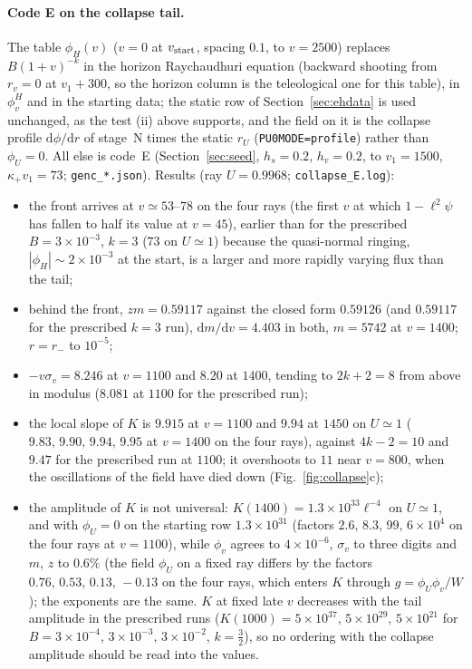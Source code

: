 \documentclass[11pt]{article}
\begin{document}
\paragraph{Code E on the collapse tail.} The table $\phi_H(v)$ ($v=0$ at $v_{\rm start}$, spacing $0.1$, to $v=2500$) replaces $B(1+v)^{-k}$ in the horizon Raychaudhuri equation (backward shooting from $r_v=0$ at $v_1+300$, so the horizon column is the teleological one for this table), in $\phi_v^{H}$ and in the starting data; the static row of Section~\ref{sec:ehdata} is used unchanged, as the test (ii) above supports, and the field on it is the collapse profile $\mathrm d\phi/\mathrm dr$ of stage~N times the static $r_U$ (\texttt{PU0MODE=profile}) rather than $\phi_U=0$. All else is code~E (Section~\ref{sec:seed}, $h_s=0.2$, $h_v=0.2$, to $v_1=1500$, $\kappa_+v_1=73$; \texttt{genc\_*.json}). Results (ray $U=0.9968$; \texttt{collapse\_E.log}):
\begin{itemize}
\item the front arrives at $v\simeq53$--$78$ on the four rays (the first $v$ at which $1-\ell^{2}\psi$ has fallen to half its value at $v=45$), earlier than for the prescribed $B=3\times10^{-3}$, $k=3$ ($73$ on $U\simeq1$) because the quasi-normal ringing, $|\phi_H|\sim2\times10^{-3}$ at the start, is a larger and more rapidly varying flux than the tail;
\item behind the front, $zm=0.59117$ against the closed form $0.59126$ (and $0.59117$ for the prescribed $k=3$ run), $\mathrm dm/\mathrm dv=4.403$ in both, $m=5742$ at $v=1400$; $r=r_-$ to $10^{-5}$;
\item $-v\sigma_v=8.246$ at $v=1100$ and $8.20$ at $1400$, tending to $2k+2=8$ from above in modulus ($8.081$ at $1100$ for the prescribed run);
\item the local slope of $K$ is $9.915$ at $v=1100$ and $9.94$ at $1450$ on $U\simeq1$ ($9.83,\,9.90,\,9.94,\,9.95$ at $v=1400$ on the four rays), against $4k-2=10$ and $9.47$ for the prescribed run at $1100$; it overshoots to $11$ near $v=800$, when the oscillations of the field have died down (Fig.~\ref{fig:collapse}c);
\item the amplitude of $K$ is not universal: $K(1400)=1.3\times10^{33}\ell^{-4}$ on $U\simeq1$, and with $\phi_U=0$ on the starting row $1.3\times10^{31}$ (factors $2.6,\,8.3,\,99,\,6\times10^{4}$ on the four rays at $v=1100$), while $\phi_v$ agrees to $4\times10^{-6}$, $\sigma_v$ to three digits and $m$, $z$ to $0.6\%$ (the field $\phi_U$ on a fixed ray differs by the factors $0.76,\,0.53,\,0.13,\,-0.13$ on the four rays, which enters $K$ through $g=\phi_U\phi_v/W$); the exponents are the same. $K$ at fixed late $v$ decreases with the tail amplitude in the prescribed runs ($K(1000)=5\times10^{37},\,5\times10^{29},\,5\times10^{21}$ for $B=3\times10^{-4},\,3\times10^{-3},\,3\times10^{-2}$, $k=\tfrac32$), so no ordering with the collapse amplitude should be read into the values.
\end{itemize}
\end{document}
